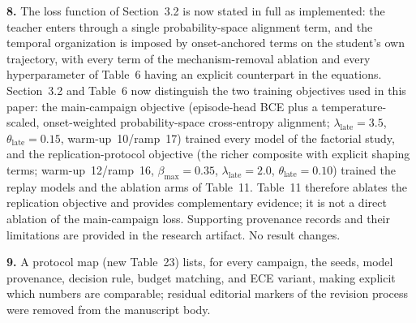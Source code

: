 \documentclass[1p,12pt,authoryear]{elsarticle}
\providecommand{\revcolor}{black}%
\begin{document}
\vspace{2mm}
\noindent \textbf{8.} The loss function of Section~3.2 is now stated in full as implemented: the teacher enters through a single probability-space alignment term, and the temporal organization is imposed by onset-anchored terms on the student's own trajectory, with every term of the mechanism-removal ablation and every hyperparameter of Table~6 having an explicit counterpart in the equations. {\color{\revcolor}Section~3.2 and Table~6 now distinguish the two training objectives used in this paper: the main-campaign objective (episode-head BCE plus a temperature-scaled, onset-weighted probability-space cross-entropy alignment; $\lambda_{\text{late}}{=}3.5$, $\theta_{\text{late}}{=}0.15$, warm-up~10/ramp~17) trained every model of the factorial study, and the replication-protocol objective (the richer composite with explicit shaping terms; warm-up~12/ramp~16, $\beta_{\max}{=}0.35$, $\lambda_{\text{late}}{=}2.0$, $\theta_{\text{late}}{=}0.10$) trained the replay models and the ablation arms of Table~11. Table~11 therefore ablates the replication objective and provides complementary evidence; it is not a direct ablation of the main-campaign loss. Supporting provenance records and their limitations are provided in the research artifact. No result changes.}

\vspace{2mm}
\noindent \textbf{9.} A protocol map (new Table~23) lists, for every campaign, the seeds, model provenance, decision rule, budget matching, and ECE variant, making explicit which numbers are comparable; residual editorial markers of the revision process were removed from the manuscript body.
\end{document}

